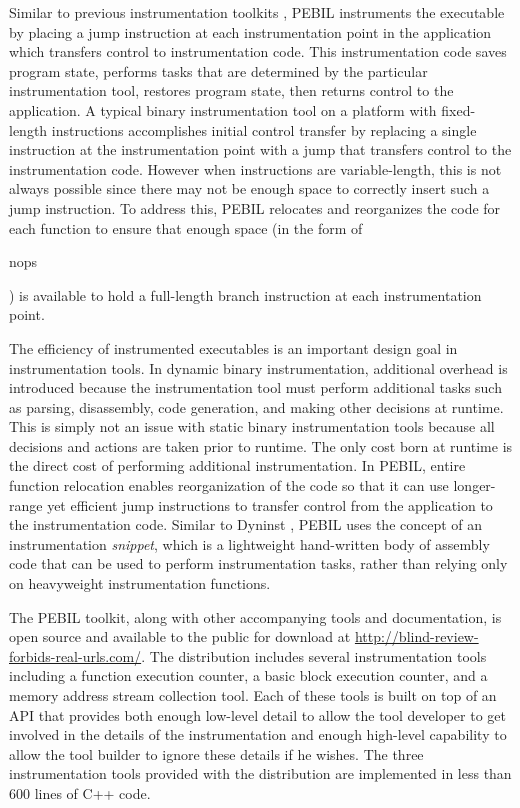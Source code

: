 Similar to previous instrumentation toolkits \cite{buck2000api}, PEBIL instruments the executable 
by placing a jump instruction at each instrumentation
point in the application which transfers control to instrumentation code. This instrumentation code saves
program state, performs tasks that are determined by the particular instrumentation tool,
restores program state, then returns control to the application.
A typical binary instrumentation tool on a platform with fixed-length instructions 
\cite{tikir2006pmac} accomplishes initial control transfer by replacing a
single instruction at the instrumentation point with a jump that transfers
control to the instrumentation code. However when instructions are variable-length,
this is not always possible since there may not be enough space to correctly 
insert such a jump instruction. To address this, PEBIL
relocates and reorganizes the code for each function to ensure that enough
space (in the form of \begin{it}nops\end{it}) is available to hold a full-length branch instruction at each
instrumentation point.

The efficiency of instrumented executables is an important design goal in instrumentation tools. In dynamic binary instrumentation,
additional overhead is introduced because the instrumentation tool must perform additional tasks such 
as parsing, disassembly, code generation, and making other decisions at runtime. This
is simply not an issue with static binary instrumentation tools because all
decisions and actions are taken prior to runtime. The only cost born at runtime is the direct
cost of performing additional instrumentation. In PEBIL, entire function relocation
enables reorganization of the code so that it
can use longer-range yet efficient jump instructions to transfer control from the
application to the instrumentation code. Similar to Dyninst \cite{buck2000api}, PEBIL uses the concept of an
instrumentation \textit{snippet}, which is a lightweight hand-written body of assembly code that can
be used to perform instrumentation tasks, rather than relying only on heavyweight
instrumentation functions.

The PEBIL toolkit, along with other accompanying tools and documentation,
is open source and available to the public for download 
at \url{http://blind-review-forbids-real-urls.com/}. The distribution includes several instrumentation tools 
including a function execution counter, a basic block
execution counter, and a memory address stream collection tool. Each of these tools is built on top of
an API that provides both enough low-level detail to allow the tool developer to get involved in the 
details of the instrumentation and enough high-level capability to allow the tool builder
to ignore these details if he wishes. The three instrumentation tools provided with the distribution are implemented in
less than 600 lines of C++ code.

